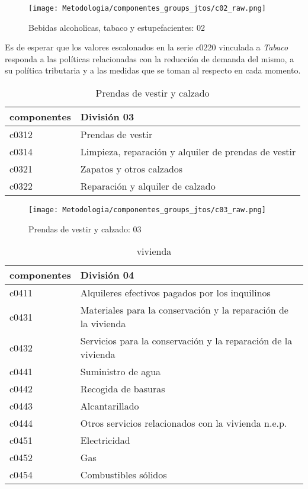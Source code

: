 \documentclass[12pt]{article}
\begin{document}
\begin{figure}[h!]
    \caption{Bebidas alcoholicas, tabaco y estupefacientes: 02}
    \label{fig:c02_raw}
    \centering
    \texttt{[image: Metodologia/componentes\_groups\_jtos/c02\_raw.png]}
\end{figure}

Es de esperar que los valores escalonados en la serie $c0220$ vinculada a \textit{Tabaco} responda a las políticas relacionadas con la reducción de demanda del mismo, a su política tributaria y a las medidas que se toman al respecto en cada momento. 

\clearpage

\begin{table}[h!]
\caption{Prendas de vestir y calzado}
\label{tab:compo_03}
\begin{tabular}{l m{10cm}}
\toprule
componentes & División 03 \\
\midrule
c0312 & Prendas de vestir \\
c0314 & Limpieza, reparación y alquiler de prendas de vestir \\
c0321 & Zapatos y otros calzados \\
c0322 & Reparación y alquiler de calzado \\
\bottomrule
\end{tabular}
\end{table}

\begin{figure}[h!]
    \caption{Prendas de vestir y calzado: 03}
    \label{fig:c03_raw}
    \centering
    \texttt{[image: Metodologia/componentes\_groups\_jtos/c03\_raw.png]}
\end{figure}

\clearpage
\begin{table}[h!]
\caption{vivienda}
\label{tab:compo_04}
\begin{tabular}{l m{10cm}}
\toprule
componentes & División 04 \\
\midrule
c0411 & Alquileres efectivos pagados por los inquilinos \\
c0431 & Materiales para la conservación y la reparación de la vivienda \\
c0432 & Servicios para la conservación y la reparación de la vivienda \\
c0441 & Suministro de agua \\
c0442 & Recogida de basuras \\
c0443 & Alcantarillado \\
c0444 & Otros servicios relacionados con la vivienda n.e.p. \\
c0451 & Electricidad \\
c0452 & Gas \\
c0454 & Combustibles sólidos \\
\bottomrule
\end{tabular}
\end{table}
\end{document}
